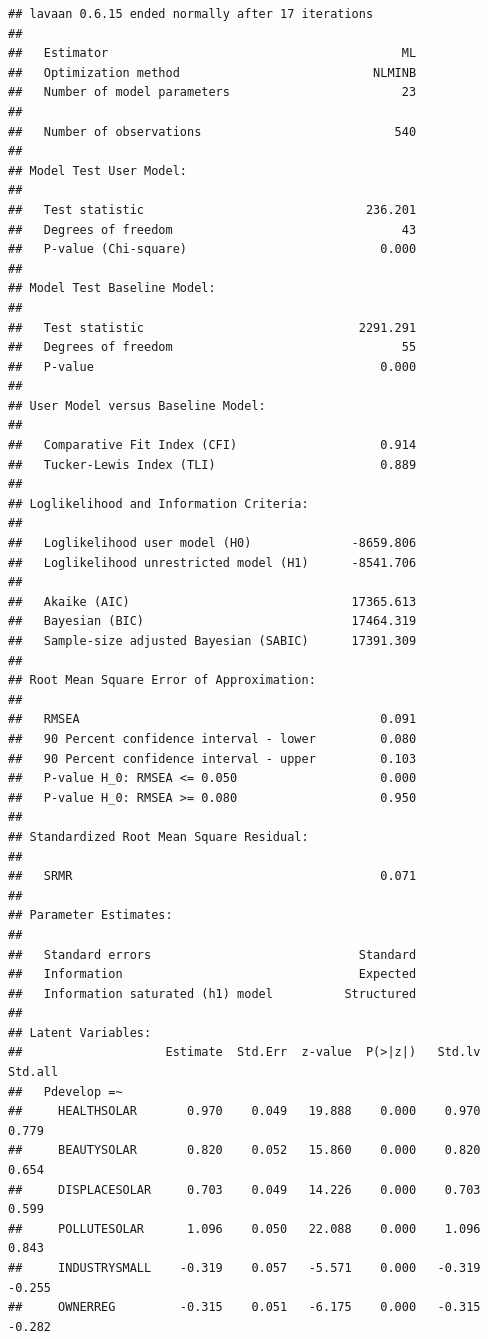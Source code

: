 \documentclass[
]{article}
\begin{document}
\begin{verbatim}
## lavaan 0.6.15 ended normally after 17 iterations
## 
##   Estimator                                         ML
##   Optimization method                           NLMINB
##   Number of model parameters                        23
## 
##   Number of observations                           540
## 
## Model Test User Model:
##                                                       
##   Test statistic                               236.201
##   Degrees of freedom                                43
##   P-value (Chi-square)                           0.000
## 
## Model Test Baseline Model:
## 
##   Test statistic                              2291.291
##   Degrees of freedom                                55
##   P-value                                        0.000
## 
## User Model versus Baseline Model:
## 
##   Comparative Fit Index (CFI)                    0.914
##   Tucker-Lewis Index (TLI)                       0.889
## 
## Loglikelihood and Information Criteria:
## 
##   Loglikelihood user model (H0)              -8659.806
##   Loglikelihood unrestricted model (H1)      -8541.706
##                                                       
##   Akaike (AIC)                               17365.613
##   Bayesian (BIC)                             17464.319
##   Sample-size adjusted Bayesian (SABIC)      17391.309
## 
## Root Mean Square Error of Approximation:
## 
##   RMSEA                                          0.091
##   90 Percent confidence interval - lower         0.080
##   90 Percent confidence interval - upper         0.103
##   P-value H_0: RMSEA <= 0.050                    0.000
##   P-value H_0: RMSEA >= 0.080                    0.950
## 
## Standardized Root Mean Square Residual:
## 
##   SRMR                                           0.071
## 
## Parameter Estimates:
## 
##   Standard errors                             Standard
##   Information                                 Expected
##   Information saturated (h1) model          Structured
## 
## Latent Variables:
##                    Estimate  Std.Err  z-value  P(>|z|)   Std.lv  Std.all
##   Pdevelop =~                                                           
##     HEALTHSOLAR       0.970    0.049   19.888    0.000    0.970    0.779
##     BEAUTYSOLAR       0.820    0.052   15.860    0.000    0.820    0.654
##     DISPLACESOLAR     0.703    0.049   14.226    0.000    0.703    0.599
##     POLLUTESOLAR      1.096    0.050   22.088    0.000    1.096    0.843
##     INDUSTRYSMALL    -0.319    0.057   -5.571    0.000   -0.319   -0.255
##     OWNERREG         -0.315    0.051   -6.175    0.000   -0.315   -0.282

\end{verbatim}
\end{document}
